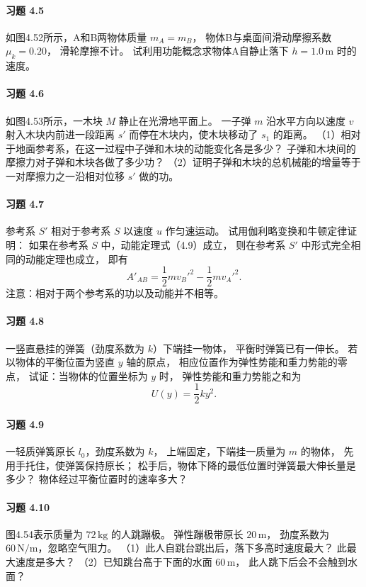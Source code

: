 \paragraph{习题 4.5}
如图4.52所示，A和B两物体质量 \(m_A=m_B\)，
物体B与桌面间滑动摩擦系数 \(\mu_k=0.20\)，
滑轮摩擦不计。
试利用功能概念求物体A自静止落下 \(h=1.0\,\mathrm m\)
时的速度。

\paragraph{习题 4.6}
如图4.53所示，一木块 \(M\) 静止在光滑地平面上。
一子弹 \(m\) 沿水平方向以速度 \(v\) 射入木块内前进一段距离 \(s'\)
而停在木块内，使木块移动了 \(s_1\) 的距离。
（1）相对于地面参考系，在这一过程中子弹和木块的动能变化各是多少？
子弹和木块间的摩擦力对子弹和木块各做了多少功？
（2）证明子弹和木块的总机械能的增量等于
一对摩擦力之一沿相对位移 \(s'\) 做的功。

\paragraph{习题 4.7}
参考系 \(S'\) 相对于参考系 \(S\) 以速度 \(u\) 作匀速运动。
试用伽利略变换和牛顿定律证明：
如果在参考系 \(S\) 中，动能定理式（4.9）成立，
则在参考系 \(S'\) 中形式完全相同的动能定理也成立，
即有
\[
 A'_{AB}=\frac12mv_B'^2-\frac12mv_A'^2.
\]
注意：相对于两个参考系的功以及动能并不相等。

\paragraph{习题 4.8}
一竖直悬挂的弹簧（劲度系数为 \(k\)）下端挂一物体，
平衡时弹簧已有一伸长。
若以物体的平衡位置为竖直 \(y\) 轴的原点，
相应位置作为弹性势能和重力势能的零点，
试证：当物体的位置坐标为 \(y\) 时，
弹性势能和重力势能之和为
\[
 U(y)=\frac12ky^2.
 \]

\paragraph{习题 4.9}
一轻质弹簧原长 \(l_0\)，劲度系数为 \(k\)，
上端固定，下端挂一质量为 \(m\) 的物体，
先用手托住，使弹簧保持原长；
松手后，物体下降的最低位置时弹簧最大伸长量是多少？
物体经过平衡位置时的速率多大？

\paragraph{习题 4.10}
图4.54表示质量为 \(72\,\mathrm{kg}\) 的人跳蹦极。
弹性蹦极带原长 \(20\,\mathrm m\)，
劲度系数为 \(60\,\mathrm{N/m}\)，忽略空气阻力。
（1）此人自跳台跳出后，落下多高时速度最大？
此最大速度是多大？
（2）已知跳台高于下面的水面 \(60\,\mathrm m\)，
此人跳下后会不会触到水面？

